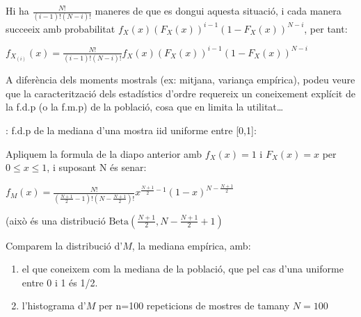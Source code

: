\documentclass[letterpaper,10pt,english]{sphinxmanual}
\let\sphinxpxdimen\pdfpxdimen\else\newdimen\sphinxpxdimen
\begin{document}
Hi ha \(\frac{N!}{(i-1)!(N-i)!}\) maneres de que es dongui
aquesta situació, i cada manera succeeix amb probabilitat
\(f_X(x)\left(F_X(x)\right)^{i-1}\left(1 - F_X(x)\right)^{N-i}\),
per tant:

\(f_{X_{(i)}}(x) = \frac{N!}{(i-1)!(N-i)!} f_X(x)\left(F_X(x)\right)^{i-1}\left(1 - F_X(x)\right)^{N-i}\)

A diferència dels moments mostrals (ex: mitjana, variança empírica),
podeu veure que la caracterització dels estadístics d’ordre
requereix un coneixement explícit de la f.d.p (o la f.m.p) de la població,
cosa que en limita la utilitat…

: f.d.p de la mediana d’una mostra iid uniforme entre {[}0,1{]}:

Apliquem la formula de la diapo anterior amb \(f_X(x) = 1\) i \(F_X(x) = x\) per \(0 \leq x \leq 1\),
i suposant N és senar:

\(f_{M}(x) = \frac{N!}{(\frac{N+1}{2}-1)!(N-\frac{N+1}{2})!} x^{\frac{N+1}{2}-1}\left(1 - x\right)^{N-\frac{N+1}{2}}\)

(això és una distribució \(\mbox{Beta}(\frac{N+1}{2}, N - \frac{N+1}{2} + 1)\)

Comparem la distribució d’\(M\), la mediana empírica, amb:
\begin{enumerate}
%
\item {} 
el que coneixem com la mediana de la població, que pel cas d’una uniforme entre 0 i 1 és 1/2.

\item {} 
l’histograma d’\(M\) per n=100 repeticions de mostres de tamany \(N=100\)

\end{enumerate}

\noindent{\hspace*{\fill}\sphinxincludegraphics[height=250\sphinxpxdimen]{{uniform_median}.png}\hspace*{\fill}}
\end{document}
